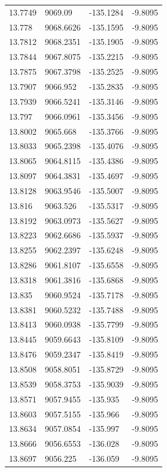 \begin{table}[H]
\begin{tabular}{llll}
13.7749 & 9069.09 & -135.1284 & -9.8095 \\
13.778 & 9068.6626 & -135.1595 & -9.8095 \\
13.7812 & 9068.2351 & -135.1905 & -9.8095 \\
13.7844 & 9067.8075 & -135.2215 & -9.8095 \\
13.7875 & 9067.3798 & -135.2525 & -9.8095 \\
13.7907 & 9066.952 & -135.2835 & -9.8095 \\
13.7939 & 9066.5241 & -135.3146 & -9.8095 \\
13.797 & 9066.0961 & -135.3456 & -9.8095 \\
13.8002 & 9065.668 & -135.3766 & -9.8095 \\
13.8033 & 9065.2398 & -135.4076 & -9.8095 \\
13.8065 & 9064.8115 & -135.4386 & -9.8095 \\
13.8097 & 9064.3831 & -135.4697 & -9.8095 \\
13.8128 & 9063.9546 & -135.5007 & -9.8095 \\
13.816 & 9063.526 & -135.5317 & -9.8095 \\
13.8192 & 9063.0973 & -135.5627 & -9.8095 \\
13.8223 & 9062.6686 & -135.5937 & -9.8095 \\
13.8255 & 9062.2397 & -135.6248 & -9.8095 \\
13.8286 & 9061.8107 & -135.6558 & -9.8095 \\
13.8318 & 9061.3816 & -135.6868 & -9.8095 \\
13.835 & 9060.9524 & -135.7178 & -9.8095 \\
13.8381 & 9060.5232 & -135.7488 & -9.8095 \\
13.8413 & 9060.0938 & -135.7799 & -9.8095 \\
13.8445 & 9059.6643 & -135.8109 & -9.8095 \\
13.8476 & 9059.2347 & -135.8419 & -9.8095 \\
13.8508 & 9058.8051 & -135.8729 & -9.8095 \\
13.8539 & 9058.3753 & -135.9039 & -9.8095 \\
13.8571 & 9057.9455 & -135.935 & -9.8095 \\
13.8603 & 9057.5155 & -135.966 & -9.8095 \\
13.8634 & 9057.0854 & -135.997 & -9.8095 \\
13.8666 & 9056.6553 & -136.028 & -9.8095 \\
13.8697 & 9056.225 & -136.059 & -9.8095 \\

\end{tabular}
\end{table}
